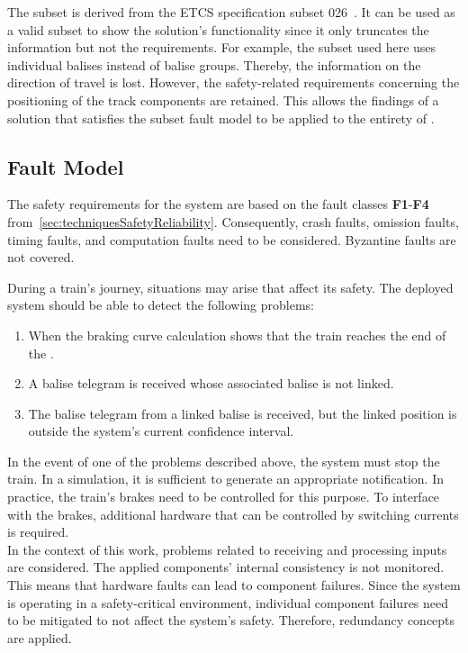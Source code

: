 The subset is derived from the ETCS specification subset 026~\cite{ETCS26}.
It can be used as a valid subset to show the solution's functionality since it only truncates the information but not the requirements.
For example, the subset used here uses individual balises instead of balise groups.
Thereby, the information on the direction of travel is lost.
However, the safety-related requirements concerning the positioning of the track components are retained.
This allows the findings of a solution that satisfies the subset fault model to be applied to the entirety of .

\subsection{Fault Model}
\label{subsec:faultModel}
The safety requirements for the system are based on the fault classes \textbf{F1}-\textbf{F4} from~\autoref{sec:techniquesSafetyReliability}\cite{CristianFaultModel}.
Consequently, crash faults, omission faults, timing faults, and computation faults need to be considered.
Byzantine faults are not covered.

During a train's journey, situations may arise that affect its safety.
The deployed system should be able to detect the following problems:

\begin{enumerate}
\item When the braking curve calculation shows that the train reaches the end of the .
\item A balise telegram is received whose associated balise is not linked.
\item The balise telegram from a linked balise is received, but the linked position is outside the system's current confidence interval.
\end{enumerate}

In the event of one of the problems described above, the system must stop the train.
In a simulation, it is sufficient to generate an appropriate notification.
In practice, the train's brakes need to be controlled for this purpose.
To interface with the brakes, additional hardware that can be controlled by switching currents is required.
\\

In the context of this work, problems related to receiving and processing inputs are considered.
The applied components' internal consistency is not monitored.
This means that hardware faults can lead to component failures.
Since the system is operating in a safety-critical environment, individual component failures need to be mitigated to not affect the system's safety.
Therefore, redundancy concepts are applied.

